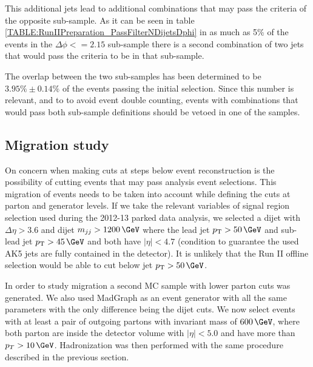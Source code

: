 

This additional jets lead to additional combinations that may pass the criteria of the opposite sub-sample. As it can be seen in table \ref{TABLE:RunIIPreparation_PassFilterNDijetsDphi} in as much as 5\% of the events in the $\Delta\phi<=2.15$ sub-sample there is a second combination of two jets that would pass the criteria to be in that sub-sample.



The overlap between the two sub-samples has been determined to be $3.95\% \pm 0.14\%$ of the events passing the initial selection. Since this number is relevant, and to to avoid event double counting, events with combinations that would pass both sub-sample definitions should be vetoed in one of the samples.

\subsection{Migration study}
\label{SUBSECTION:RunIIPreparation_MigrationStudy}


On concern when making cuts at steps below event reconstruction is the possibility of cutting events that may pass analysis event selections. This migration of events needs to be taken into account while defining the cuts at parton and generator levels. If we take the relevant variables of signal region selection used during the 2012-13 parked data analysis, we selected a dijet with   $\Delta\eta>3.6$ and dijet $m_{jj}>1200\,\GeV$ where the lead jet $\pt > 50\,\GeV$ and sub-lead jet $\pt > 45\,\GeV$ and both have $|\eta|<4.7$ (condition to guarantee the used AK5 jets are fully contained in the detector). It is unlikely that the Run II offline selection would be able to cut below jet $\pt > 50\,\GeV$.

In order to study migration a second \gls{MC} sample with lower parton cuts was generated. We also used MadGraph as an event generator with all the same parameters with the only difference being the dijet cuts. We now select events with at least a pair of outgoing partons with invariant mass of $600\,\GeV$, where both parton are inside the detector volume with $|\eta|<5.0$ and have more than $p_{T}>10\,\GeV$. Hadronization was then performed with the same procedure described in the previous section.

